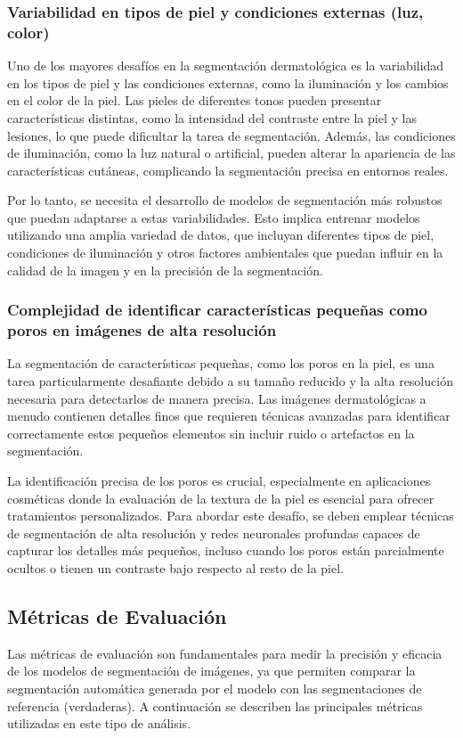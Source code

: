 \subsubsection{Variabilidad en tipos de piel y condiciones externas (luz, color)}
Uno de los mayores desafíos en la segmentación dermatológica es la variabilidad en los tipos de piel y las condiciones externas, como la iluminación y los cambios en el color de la piel. Las pieles de diferentes tonos pueden presentar características distintas, como la intensidad del contraste entre la piel y las lesiones, lo que puede dificultar la tarea de segmentación. Además, las condiciones de iluminación, como la luz natural o artificial, pueden alterar la apariencia de las características cutáneas, complicando la segmentación precisa en entornos reales.

Por lo tanto, se necesita el desarrollo de modelos de segmentación más robustos que puedan adaptarse a estas variabilidades. Esto implica entrenar modelos utilizando una amplia variedad de datos, que incluyan diferentes tipos de piel, condiciones de iluminación y otros factores ambientales que puedan influir en la calidad de la imagen y en la precisión de la segmentación. \parencite{zhao2021}

\subsubsection{Complejidad de identificar características pequeñas como poros en imágenes de alta resolución}
La segmentación de características pequeñas, como los poros en la piel, es una tarea particularmente desafiante debido a su tamaño reducido y la alta resolución necesaria para detectarlos de manera precisa. Las imágenes dermatológicas a menudo contienen detalles finos que requieren técnicas avanzadas para identificar correctamente estos pequeños elementos sin incluir ruido o artefactos en la segmentación.

La identificación precisa de los poros es crucial, especialmente en aplicaciones cosméticas donde la evaluación de la textura de la piel es esencial para ofrecer tratamientos personalizados. Para abordar este desafío, se deben emplear técnicas de segmentación de alta resolución y redes neuronales profundas capaces de capturar los detalles más pequeños, incluso cuando los poros están parcialmente ocultos o tienen un contraste bajo respecto al resto de la piel. \parencite{yang2020}
\subsection{Métricas de Evaluación}  
Las métricas de evaluación son fundamentales para medir la precisión y eficacia de los modelos de segmentación de imágenes, ya que permiten comparar la segmentación automática generada por el modelo con las segmentaciones de referencia (verdaderas). A continuación se describen las principales métricas utilizadas en este tipo de análisis.

